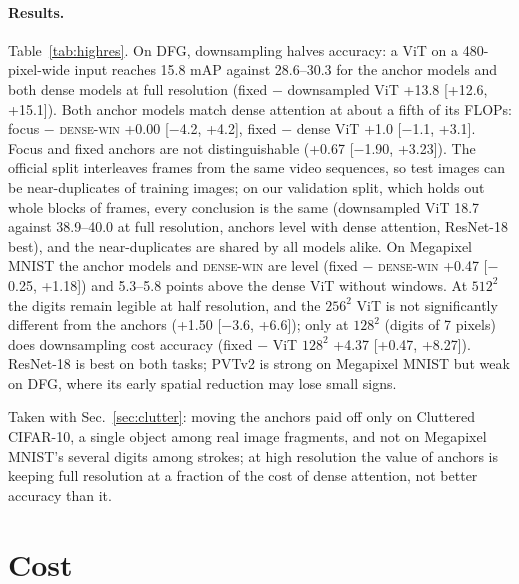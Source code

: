 \documentclass[10pt]{article}
\newcommand{\densewin}{\textsc{dense-win}}
\begin{document}
\paragraph{Results.} Table~\ref{tab:highres}. On DFG, downsampling halves accuracy: a ViT on a
480-pixel-wide input reaches 15.8 mAP against 28.6--30.3 for the anchor models and both dense
models at full resolution (fixed $-$ downsampled ViT +13.8 [+12.6, +15.1]). Both anchor models match dense attention at
about a fifth of its FLOPs: focus $-$ \densewin{} +0.00 [$-$4.2, +4.2], fixed $-$ dense ViT +1.0
[$-$1.1, +3.1]. Focus and fixed anchors are not distinguishable (+0.67 [$-$1.90, +3.23]). The
official split interleaves frames from the same video sequences, so test images can be
near-duplicates of training images; on our validation split, which holds out whole blocks of
frames, every conclusion is the same (downsampled ViT 18.7 against 38.9--40.0 at full resolution,
anchors level with dense attention, ResNet-18 best), and the near-duplicates are shared by all
models alike. On
Megapixel MNIST the anchor models and \densewin{} are level (fixed $-$ \densewin{} +0.47
[$-$0.25, +1.18]) and 5.3--5.8 points above the dense ViT without windows. At $512^2$ the digits
remain legible at half resolution, and the $256^2$ ViT is not significantly different from the
anchors (+1.50 [$-$3.6, +6.6]); only at $128^2$ (digits of 7 pixels) does downsampling cost
accuracy (fixed $-$ ViT $128^2$ +4.37 [+0.47, +8.27]). ResNet-18 is best on both tasks; PVTv2 is
strong on Megapixel MNIST but weak on DFG, where its early spatial reduction may lose small signs.

Taken with Sec.~\ref{sec:clutter}: moving the anchors paid off only on Cluttered CIFAR-10, a
single object among real image fragments, and not on Megapixel MNIST's several digits among
strokes; at high resolution the value of anchors is keeping full resolution at a fraction of the
cost of dense attention, not better accuracy than it.

\section{Cost}
\label{sec:cost}
\end{document}
